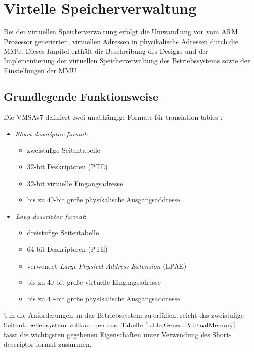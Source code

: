 \section{Virtelle Speicherverwaltung}

Bei der virtuellen Speicherverwaltung erfolgt die Umwandlung von vom ARM Prozessor generierten, virtuellen Adressen in physikalische Adressen durch die \ac{MMU}. Dieses Kapitel enthält die Beschreibung des Designs und der Implementierung der virtuellen Speicherverwaltung des Betriebssystems sowie der Einstellungen der MMU.\\

\subsection{Grundlegende Funktionsweise}

Die \ac{VMSAv7} definiert zwei unabhängige Formate für translation tables \cite[S. B3-1318]{ARM:ARM}:

\begin{itemize}
	\item \emph{Short-descriptor format}:
	\begin{itemize}
		\item zweistufige Seitentabelle 
		\item 32-bit Deskriptoren (PTE)
		\item 32-bit virtuelle Eingangsadresse 
		\item bis zu 40-bit große physikalische Ausgangsaddresse
	\end{itemize}
	\item \emph{Long-descriptor format}:
	\begin{itemize}
		\item dreistufige Seitentabelle
		\item 64-bit Deskriptoren (\acs{PTE})
		\item verwendet \emph{Large Physical Address Extension} (LPAE)
		\item bis zu 40-bit große virtuelle Eingangsadresse 
		\item bis zu 40-bit große physikalische Ausgangsaddresse
	\end{itemize}
\end{itemize}

Um die Anforderungen an das Betriebssystem zu erfüllen, reicht das zweistufige Seitentabellensystem vollkommen aus. Tabelle \ref{table:GeneralVirtualMemory} fasst die wichtigsten gegebenen Eigenschaften unter Verwendung des Short-descriptor format zusammen.\\


